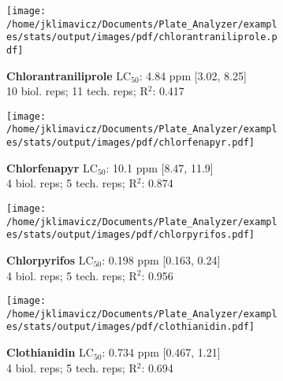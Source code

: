 \documentclass{article}
\begin{document}
\begin{figure}[thp!]
   \begin{subfigure}{0.500\textwidth}
      \centering
      \texttt{[image: /home/jklimavicz/Documents/Plate\_Analyzer/examples/stats/output/images/pdf/chlorantraniliprole.pdf]}
      \vspace{-0.05cm}
      \caption*{\textbf{Chlorantraniliprole} LC$_{50}$: 4.84 ppm [3.02, 8.25] \\ 
10 biol. reps; 11 tech. reps; R$^2$: 0.417}
      \vspace{0.1cm}
   \end{subfigure}%
   \begin{subfigure}{0.500\textwidth}
      \centering
      \texttt{[image: /home/jklimavicz/Documents/Plate\_Analyzer/examples/stats/output/images/pdf/chlorfenapyr.pdf]}
      \vspace{-0.05cm}
      \caption*{\textbf{Chlorfenapyr} LC$_{50}$: 10.1 ppm [8.47, 11.9] \\ 
4 biol. reps; 5 tech. reps; R$^2$: 0.874}
      \vspace{0.1cm}
   \end{subfigure}%
\vspace{-0.1cm}
   \begin{subfigure}{0.500\textwidth}
      \centering
      \texttt{[image: /home/jklimavicz/Documents/Plate\_Analyzer/examples/stats/output/images/pdf/chlorpyrifos.pdf]}
      \vspace{-0.05cm}
      \caption*{\textbf{Chlorpyrifos} LC$_{50}$: 0.198 ppm [0.163, 0.24] \\ 
4 biol. reps; 5 tech. reps; R$^2$: 0.956}
      \vspace{0.1cm}
   \end{subfigure}%
   \begin{subfigure}{0.500\textwidth}
      \centering
      \texttt{[image: /home/jklimavicz/Documents/Plate\_Analyzer/examples/stats/output/images/pdf/clothianidin.pdf]}
      \vspace{-0.05cm}
      \caption*{\textbf{Clothianidin} LC$_{50}$: 0.734 ppm [0.467, 1.21] \\ 
4 biol. reps; 5 tech. reps; R$^2$: 0.694}
      \vspace{0.1cm}
   \end{subfigure}%
\vspace{-0.1cm}
   \begin{subfigure}{0.500\textwidth}
      \centering

\end{subfigure}
\end{figure}
\end{document}
